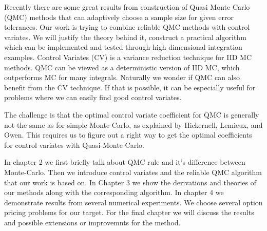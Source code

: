 
Recently there are some great results from construction of Quasi Monte Carlo (QMC) methods that can adaptively choose a sample size for given error tolerances\cite{hickernell2014reliable}.   
Our work is trying to combine reliable QMC methods with control variates. We will justify the theory behind it, construct a practical algorithm which can be implemented and tested through high dimensional integration examples.
Control Variates (CV) is a variance reduction technique for IID MC methods.
QMC can be viewed as a deterministic version of IID MC, which outperforms MC for many integrals\cite{avramidis1996integrated}. 
Naturally we wonder if QMC can also benefit from the CV technique. If that is possible, it can be especially useful for problems where we can easily find good control variates.

The challenge is that the optimal control variate coefficient for QMC is generally not the same as for simple Monte Carlo, as explained by Hickernell, Lemieux, and Owen\cite{hickernell2005control}. This requires us to figure out a right way to get the optimal coefficients for control variates with Quasi-Monte Carlo.

In chapter 2 we first briefly talk about QMC rule and it's difference between Monte-Carlo. 
Then we introduce control variates and the reliable QMC algorithm that our work is based on. 
In Chapter 3 we show the derivations and theories of our methods along with the corresponding algorithm.
In chapter 4 we demonstrate results from several numerical experiments. We choose several option pricing problems for our target. For the final chapter we will discuss the results and possible extensions or improvemnts for the method.
